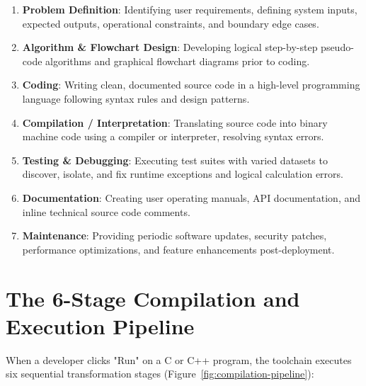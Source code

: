 \begin{enumerate}[leftmargin=1.5em]
    \item \textbf{Problem Definition}: Identifying user requirements, defining system inputs, expected outputs, operational constraints, and boundary edge cases.
    \item \textbf{Algorithm \& Flowchart Design}: Developing logical step-by-step pseudo-code algorithms and graphical flowchart diagrams prior to coding.
    \item \textbf{Coding}: Writing clean, documented source code in a high-level programming language following syntax rules and design patterns.
    \item \textbf{Compilation / Interpretation}: Translating source code into binary machine code using a compiler or interpreter, resolving syntax errors.
    \item \textbf{Testing \& Debugging}: Executing test suites with varied datasets to discover, isolate, and fix runtime exceptions and logical calculation errors.
    \item \textbf{Documentation}: Creating user operating manuals, API documentation, and inline technical source code comments.
    \item \textbf{Maintenance}: Providing periodic software updates, security patches, performance optimizations, and feature enhancements post-deployment.
\end{enumerate}

\section{The 6-Stage Compilation and Execution Pipeline}

When a developer clicks "Run" on a C or C++ program, the toolchain executes six sequential transformation stages (Figure~\ref{fig:compilation-pipeline}):

